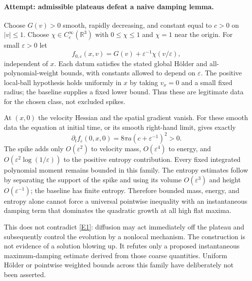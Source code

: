 \documentclass[11pt,a4paper]{article}
\newcommand{\R}{\mathbb{R}}
\newcommand{\eps}{\varepsilon}
\newcommand{\eref}[2]{\hyperlink{extra:#1:#2}{[E#2]}}
\numberwithin{equation}{section}
\begin{document}
\paragraph{Attempt: admissible plateaus defeat a naive damping lemma.}
Choose $G(v)>0$ smooth, rapidly decreasing, and constant equal to $c>0$
on $|v|\le1$. Choose $\chi\in C_c^\infty(\R^3)$ with
$0\le\chi\le1$ and $\chi=1$ near the origin. For small $\eps>0$ let
\begin{equation}\label{eq179-spike}
 f_{0,\eps}(x,v)=G(v)+\eps^{-1}\chi(v/\eps),
\end{equation}
independent of $x$. Each datum satisfies the stated global H\"older and
all-polynomial-weight bounds, with constants allowed to depend on $\eps$.
The positive local-ball hypothesis holds uniformly in $x$ by taking
$v_x=0$ and a small fixed radius; the baseline supplies a fixed lower bound.
Thus these are legitimate data for the chosen class, not excluded spikes.

At $(x,0)$ the velocity Hessian and the spatial gradient vanish. For these
smooth data the equation at initial time, or its smooth right-hand limit,
gives exactly
\begin{equation}\label{eq179-positive}
       \partial_t f_{\eps}(0,x,0)
                         =8\pi a(c+\eps^{-1})^2>0.
\end{equation}
The spike adds only $O(\eps^2)$ to velocity mass, $O(\eps^4)$ to energy,
and $O(\eps^2\log(1/\eps))$ to the positive entropy contribution.
Every fixed integrated polynomial moment remains bounded in this family.
The entropy estimates follow by separating the support of the spike and
using its volume $O(\eps^3)$ and height $O(\eps^{-1})$; the baseline has
finite entropy. Therefore bounded mass, energy, and entropy alone cannot
force a universal pointwise inequality with an instantaneous damping term
that dominates the quadratic growth at all high flat maxima.

This does not contradict \eref{statement}{1}: diffusion may act immediately off
the plateau and subsequently control the evolution by a nonlocal mechanism.
The construction is not evidence of a solution blowing up. It refutes only
a proposed instantaneous maximum-damping estimate derived from those
coarse quantities. Uniform H\"older or pointwise weighted bounds across
this family have deliberately not been asserted.
\end{document}
